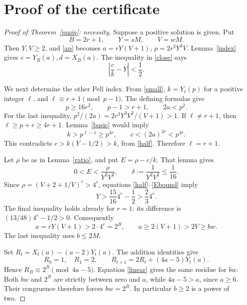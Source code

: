 \documentclass[11pt]{article}
\begin{document}
\section{Proof of the certificate}

\begin{proof}[Proof of Theorem~\ref{main}: necessity]
Suppose a positive solution is given.  Put
\[
              B=2r+1,\qquad Y=sM,\qquad V=wM.
\]
Then \(Y,V\ge2\), and \eqref{ap} becomes
\(a=rY(V+1)\), \(p=2r^2Y^2V\).
Lemma~\ref{index} gives \(c=Y_B(a),d=X_B(a)\).
The inequality in \eqref{close} says
\begin{equation}\label{half}
                   \left|\frac ck-Y\right|<\frac12.
\end{equation}

We next determine the other Pell index.  From \eqref{small},
\(k=Y_\ell(p)\) for a positive integer \(\ell\), and
\(\ell\equiv r+1\pmod{p-1}\).  The defining formulas give
\[
           p\ge16r^2,\qquad p-1>r+1,\qquad 2a<p^2.
\]
For the last inequality,
\(p^2/(2a)=2r^3Y^3V^2/(V+1)>1\).
If \(\ell\ne r+1\), then
\(\ell\ge p+r\ge4r+1\).  Lemma~\ref{basic} would imply
\[
       k>p^{\ell-1}\ge p^{4r},\qquad
       c<(2a)^{2r}<p^{4r}.
\]
This contradicts \(c>k(Y-1/2)>k\), from \eqref{half}.
Therefore \(\ell=r+1\).

Let \(\rho\) be as in Lemma~\ref{ratio}, and put
\(E=\rho-c/k\).  That lemma gives
\begin{equation}\label{Ebound}
       0<E<\frac{\rho}{Y^2V^2},\qquad
       \delta:=\frac1{Y^2V^2}\le\frac1{16}.
\end{equation}
Since \(\rho=(V+2+1/V)^r>4^r\), equations
\eqref{half}--\eqref{Ebound} imply
\[
       Y>\frac{15}{16}4^r-\frac12
        >\frac{2}{3} 4^r.
\]
The final inequality holds already for \(r=1\): its difference
is \((13/48)4^r-1/2>0\).  Consequently
\begin{equation}\label{a-bounds}
      a=rY(V+1)>2\cdot4^r=2^B,
      \qquad a\ge2(V+1)>2V\ge bw.
\end{equation}
The last inequality uses \(b\le2M\).

Set \(R_t=X_t(a)-(a-2)Y_t(a)\).  The addition identities give
\[
 R_0=1,\quad R_1=2,\qquad
 R_{t+1}=2R_t+(4a-5)Y_t(a).
\]
Hence \(R_B\equiv2^B\pmod{4a-5}\).
Equation \eqref{linear} gives the same residue for \(bw\).
Both \(bw\) and \(2^B\) are strictly between zero and \(a\),
while \(4a-5>a\), since \(a\ge6\).  Their congruence therefore
forces \(bw=2^B\).  In particular \(b\ge2\) is a power of two.


\end{proof}
\end{document}
